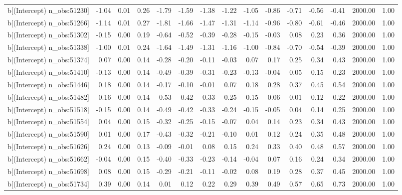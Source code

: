 \begin{table}[ht]
\begin{tabular}{rrrrrrrrrrrrrrr}
  b[(Intercept) n\_obs:51230] & -1.04 & 0.01 & 0.26 & -1.79 & -1.59 & -1.38 & -1.22 & -1.05 & -0.86 & -0.71 & -0.56 & -0.41 & 2000.00 & 1.00 \\ 
  b[(Intercept) n\_obs:51266] & -1.14 & 0.01 & 0.27 & -1.81 & -1.66 & -1.47 & -1.31 & -1.14 & -0.96 & -0.80 & -0.61 & -0.46 & 2000.00 & 1.00 \\ 
  b[(Intercept) n\_obs:51302] & -0.15 & 0.00 & 0.19 & -0.64 & -0.52 & -0.39 & -0.28 & -0.15 & -0.03 & 0.08 & 0.23 & 0.36 & 2000.00 & 1.00 \\ 
  b[(Intercept) n\_obs:51338] & -1.00 & 0.01 & 0.24 & -1.64 & -1.49 & -1.31 & -1.16 & -1.00 & -0.84 & -0.70 & -0.54 & -0.39 & 2000.00 & 1.00 \\ 
  b[(Intercept) n\_obs:51374] & 0.07 & 0.00 & 0.14 & -0.28 & -0.20 & -0.11 & -0.03 & 0.07 & 0.17 & 0.25 & 0.34 & 0.43 & 2000.00 & 1.00 \\ 
  b[(Intercept) n\_obs:51410] & -0.13 & 0.00 & 0.14 & -0.49 & -0.39 & -0.31 & -0.23 & -0.13 & -0.04 & 0.05 & 0.15 & 0.23 & 2000.00 & 1.00 \\ 
  b[(Intercept) n\_obs:51446] & 0.18 & 0.00 & 0.14 & -0.17 & -0.10 & -0.01 & 0.07 & 0.18 & 0.28 & 0.37 & 0.45 & 0.54 & 2000.00 & 1.00 \\ 
  b[(Intercept) n\_obs:51482] & -0.16 & 0.00 & 0.14 & -0.53 & -0.42 & -0.33 & -0.25 & -0.15 & -0.06 & 0.01 & 0.12 & 0.22 & 2000.00 & 1.00 \\ 
  b[(Intercept) n\_obs:51518] & -0.15 & 0.00 & 0.14 & -0.49 & -0.42 & -0.33 & -0.24 & -0.15 & -0.05 & 0.04 & 0.14 & 0.25 & 2000.00 & 1.00 \\ 
  b[(Intercept) n\_obs:51554] & 0.04 & 0.00 & 0.15 & -0.32 & -0.25 & -0.15 & -0.07 & 0.04 & 0.14 & 0.23 & 0.34 & 0.43 & 2000.00 & 1.00 \\ 
  b[(Intercept) n\_obs:51590] & 0.01 & 0.00 & 0.17 & -0.43 & -0.32 & -0.21 & -0.10 & 0.01 & 0.12 & 0.24 & 0.35 & 0.48 & 2000.00 & 1.00 \\ 
  b[(Intercept) n\_obs:51626] & 0.24 & 0.00 & 0.13 & -0.09 & -0.01 & 0.08 & 0.15 & 0.24 & 0.33 & 0.40 & 0.48 & 0.57 & 2000.00 & 1.00 \\ 
  b[(Intercept) n\_obs:51662] & -0.04 & 0.00 & 0.15 & -0.40 & -0.33 & -0.23 & -0.14 & -0.04 & 0.07 & 0.16 & 0.24 & 0.34 & 2000.00 & 1.00 \\ 
  b[(Intercept) n\_obs:51698] & 0.08 & 0.00 & 0.15 & -0.29 & -0.21 & -0.11 & -0.02 & 0.08 & 0.19 & 0.28 & 0.37 & 0.45 & 2000.00 & 1.00 \\ 
  b[(Intercept) n\_obs:51734] & 0.39 & 0.00 & 0.14 & 0.01 & 0.12 & 0.22 & 0.29 & 0.39 & 0.49 & 0.57 & 0.65 & 0.73 & 2000.00 & 1.00 \\ 

\end{tabular}
\end{table}
